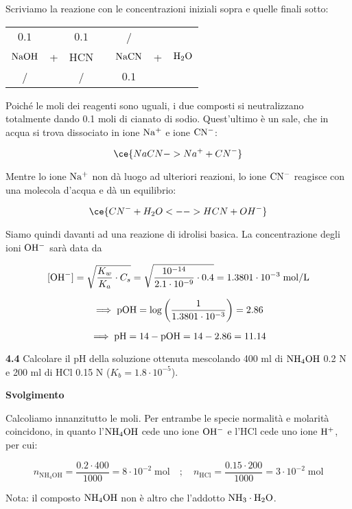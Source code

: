 Scriviamo la reazione con le concentrazioni iniziali sopra e quelle finali sotto:

\begin{center}
    \begin{tabular}{ccccccc}
        $0.1$ &  & $0.1$ & & / &&\\
        $\rm NaOH$ & + & HCN & \ce{->} & $\rm NaCN$ & + & $\rm H_2O$\\
        / &  &  / & & $0.1$ &&\\
    \end{tabular}
\end{center}

Poiché le moli dei reagenti sono uguali, i due composti si neutralizzano totalmente dando 0.1 moli di cianato di sodio. Quest'ultimo è un sale, che in acqua si trova dissociato in ione $\rm Na^+$ e ione $\rm CN^-$:

$$\ce{NaCN -> Na^+ + CN^-}$$

Mentre lo ione $\rm Na^+$ non dà luogo ad ulteriori reazioni, lo ione $\rm CN^-$ reagisce con una molecola d'acqua e dà un equilibrio:

$$\ce{CN^- + H_2O <--> HCN + OH^-}$$

Siamo quindi davanti ad una reazione di idrolisi basica. La concentrazione degli ioni $\rm OH^-$ sarà data da

$$[\text{OH}^-]
=\sqrt{\frac{K_w}{K_a}\cdot C_s}
=\sqrt{\frac{10^{-14}}{2.1 \cdot 10^{-9}} \cdot 0.4}
=1.3801 \cdot 10^{-3} \; \rm mol/L$$

$$\implies \rm pOH
=\log{\left(\frac{1}{1.3801 \cdot 10^{-3}}\right)}
=2.86$$

$$\implies \rm pH=14-pOH=14-2.86=11.14$$

\textbf{4.4} Calcolare il pH della soluzione ottenuta mescolando 400 ml di $\rm NH_4OH$ 0.2 N e 200 ml di HCl 0.15 N ($K_b = 1.8 \cdot 10^{-5}$).

\vspace{0.2cm}\large\textbf{Svolgimento}\normalsize

\vspace{0.2cm}Calcoliamo innanzitutto le moli. Per entrambe le specie normalità e molarità coincidono, in quanto l'$\rm NH_4OH$ cede uno ione $\rm OH^-$ e l'HCl cede uno ione $\rm H^+$, per cui:

$$n_{\text{NH}_4\text{OH}}=\frac{0.2 \cdot 400}{1000}=8 \cdot 10^{-2} \; \text{mol}
\quad ; \quad
n_{\text{HCl}}=\frac{0.15 \cdot 200}{1000}=3 \cdot 10^{-2} \; \text{mol}$$

Nota: il composto $\rm NH_4OH$ non è altro che l'addotto $\rm NH_3 \cdot H_2O$.

